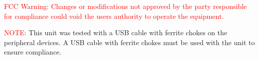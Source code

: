 \textcolor{red}{FCC Warning:}
\textcolor{red}{Changes or modifications not approved by the party responsible for compliance could void the users authority to operate the equipment.}

\textcolor{red}{NOTE:} This unit was tested with a USB cable with ferrite chokes on the peripheral devices. A USB cable with ferrite chokes must be used with the unit to ensure compliance.




\begin{comment}
\section{\texttt{Regulatory Compliance Statement Class B}} 
\subsection{\texttt{Federal Communications Commission Statement}}
\index{FCC}
\textcolor{red}{CAUTION: Changes or modifications not approved by the party responsible for compliance could void the users authority to operate the equipment.}
\texttt{NOTE:} This equipment has been tested and found to comply with the limits for a Class B digital device, pursuant to part 15 of the FCC Rules. These limits are designed to provide reasonable protection against harmful interference in a residential installation. This equipment generates, uses and can radiate radio frequency energy and, if not installed and used in accordance with the instructions, may cause harmful interference to radio communications. However, there is no guarantee that interference will not occur in a particular installation. If this equipment does cause harmful interference to radio or television reception, which can be determined by turning the equipment off and on, the user is encouraged to try to correct the interference by one or more of the following measures:
\begin{enumerate}
\item Reorient or relocate the receiving antenna.
\item Increase the separation between the equipment and receiver.
\item Connect the equipment into an outlet on a circuit different from that to which the receiver
is connected.
\item Consult the dealer or an experienced radio/TV technician for help.
\end{enumerate}
\end{comment}

